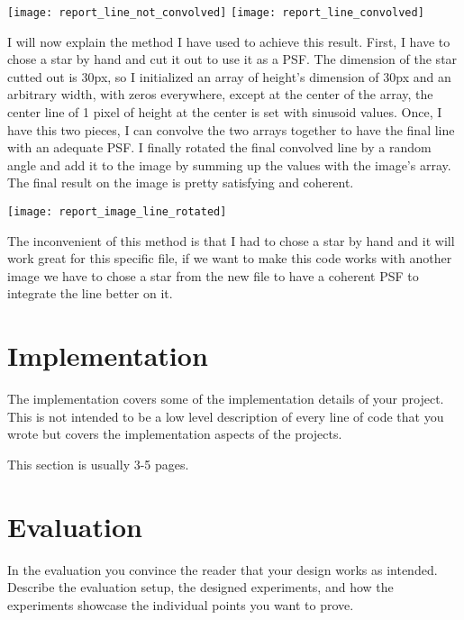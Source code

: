 \documentclass[a4paper,12pt,oneside]{report}
\begin{document}
\begin{center}
    \texttt{[image: report\_line\_not\_convolved]}
    \label{lineNotConvolved}
    \texttt{[image: report\_line\_convolved]}
    \label{lineConvolved}
\end{center}

I will now explain the method I have used to achieve this result. First, I have to chose a star by hand and cut it out to use it as a PSF.
The dimension of the star cutted out is 30px, so I initialized an array of height's dimension of 30px and an arbitrary width, with zeros everywhere,
except at the center of the array, the center line of 1 pixel of height at the center is set with sinusoid values. Once, I have this two pieces,
I can convolve the two arrays together to have the final line with an adequate PSF. I finally rotated the final convolved line by a random angle
and add it to the image by summing up the values with the image's array. The final result on the image is pretty satisfying and coherent.
\begin{center}
    \texttt{[image: report\_image\_line\_rotated]}
    \label{lineOnImage}
\end{center}
The inconvenient of this method is that I had to chose a star by hand and it will work great for this specific file, if we want to make this code 
works with another image we have to chose a star from the new file to have a coherent PSF to integrate the line better on it.


\chapter{Implementation}

The implementation covers some of the implementation details of your project.
This is not intended to be a low level description of every line of code that
you wrote but covers the implementation aspects of the projects.

This section is usually 3-5 pages.


\chapter{Evaluation}

In the evaluation you convince the reader that your design works as intended.
Describe the evaluation setup, the designed experiments, and how the
experiments showcase the individual points you want to prove.
\end{document}
